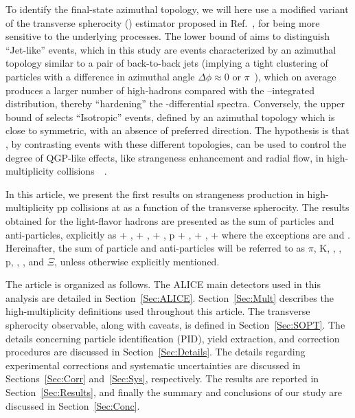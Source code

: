 To identify the final-state azimuthal topology, we will here use a modified variant of the transverse spherocity (\SO) estimator proposed in Ref.~\cite{ALICE:2019dfi}, for being more sensitive to the underlying processes. The lower bound of \SO aims to distinguish “Jet-like'' events, which in this study are events characterized by an azimuthal topology similar to a pair of back-to-back jets (implying a tight clustering of particles with a difference in azimuthal angle $\Delta\phi \approx 0$ or $\pi$~\cite{ALICE:2019dfi}), which on average produces a larger number of high-\pt hadrons compared with the \SO--integrated distribution, thereby “hardening'' the \pt-differential spectra. Conversely, the upper bound of \SO selects “Isotropic'' events, defined by an azimuthal topology which is close to symmetric, with an absence of preferred direction. The hypothesis is that \SO, by contrasting events with these different topologies, can be used to control the degree of QGP-like effects, like strangeness enhancement and radial flow, in high-multiplicity \pp collisions~\cite{Antonio2}~\cite{Antonio3}.

In this article, we present the first results on strangeness production in high-multiplicity pp collisions at  as a function of the transverse spherocity. The results obtained for the light-flavor hadrons are presented as the sum of particles and anti-particles, explicitly as \pip+ \pim, \kap+ \kam, \KSTAR + \KSTARb, p + \pbar, \lmb+ \almb, \X +  \Ix where the exceptions are \kzero and \PHI. Hereinafter, the sum of particle and anti-particles will be referred to as $\pi$, K, \kzero, \KSTAR, p, \PHI,  \lmb, and $\Xi$, unless otherwise explicitly mentioned. 

The article is organized as follows. The ALICE main detectors used in this analysis are detailed in Section~\ref{Sec:ALICE}. Section~\ref{Sec:Mult} describes the high-multiplicity definitions used throughout this article. The transverse spherocity observable, along with caveats, is defined in Section~\ref{Sec:SOPT}. The details concerning particle identification (PID), yield extraction, and correction procedures are discussed in Section~\ref{Sec:Details}. The details regarding experimental corrections and systematic uncertainties are discussed in Sections~\ref{Sec:Corr} and~\ref{Sec:Sys}, respectively. The results are reported in Section~\ref{Sec:Results}, and finally the summary and conclusions of our study are discussed in Section~\ref{Sec:Conc}.



